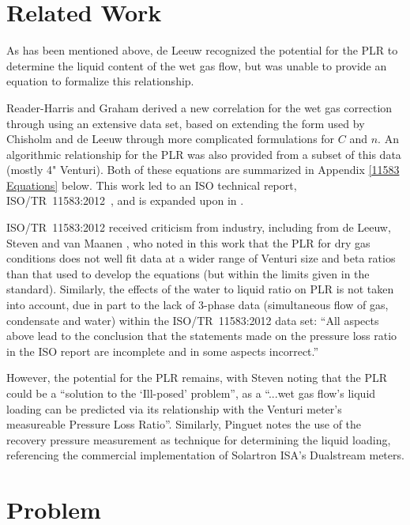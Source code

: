 \documentclass[journal]{IEEEtran}
\begin{document}
\section{Related Work}
As has been mentioned above, de Leeuw \cite{DeLeeuw1997} recognized the potential for the \acrshort{PLR} to determine the liquid content of the wet gas flow, but was unable to provide an equation to formalize this relationship.  

Reader-Harris and Graham \cite{Reader-Harris2009} derived a new correlation for the wet gas correction through using an extensive data set, based on extending the form used by Chisholm \cite{Chisholm1977} and de Leeuw \cite{DeLeeuw1997} through more complicated formulations for $C$ and $n$.  An algorithmic relationship for the \acrshort{PLR} was also provided from a subset of this data (mostly 4" Venturi).  Both of these equations are summarized in Appendix \ref{11583 Equations} below. This work led to an ISO technical report, ISO/TR~11583:2012~\cite{2003ISOTubes}, and is expanded upon in \cite{Reader-Harris2015}.  

ISO/TR~11583:2012 received criticism from industry, including from de Leeuw, Steven and van Maanen \cite{DeLeeuw2011}, who noted in this work that the \acrlong{PLR} for dry gas conditions does not well fit data at a wider range of Venturi size and beta ratios than that used to develop the equations (but within the limits given in the standard).  Similarly, the effects of the water to liquid ratio on  \acrshort{PLR} is not taken into account, due in part to the lack of 3-phase data (simultaneous flow of gas, condensate and water) within the ISO/TR~11583:2012 data set: ``All aspects above lead to the conclusion that the statements made on the pressure loss ratio in the ISO report are incomplete and in some aspects incorrect.'' 

However, the potential for the \acrlong{PLR} remains, with Steven \cite{Steven2018OrificeProblem} noting that the \acrshort{PLR} could be a ``solution to the `Ill-posed' problem'', as a ``...wet gas flow’s liquid loading can be predicted via its relationship with the Venturi meter’s measureable Pressure Loss Ratio''.  Similarly, Pinguet \cite{Pinguet2018ExtensiveConditions} notes the use of the recovery pressure measurement as technique for determining the liquid loading, referencing the commercial implementation of Solartron ISA's Dualstream meters.



\section{Problem}
\end{document}
